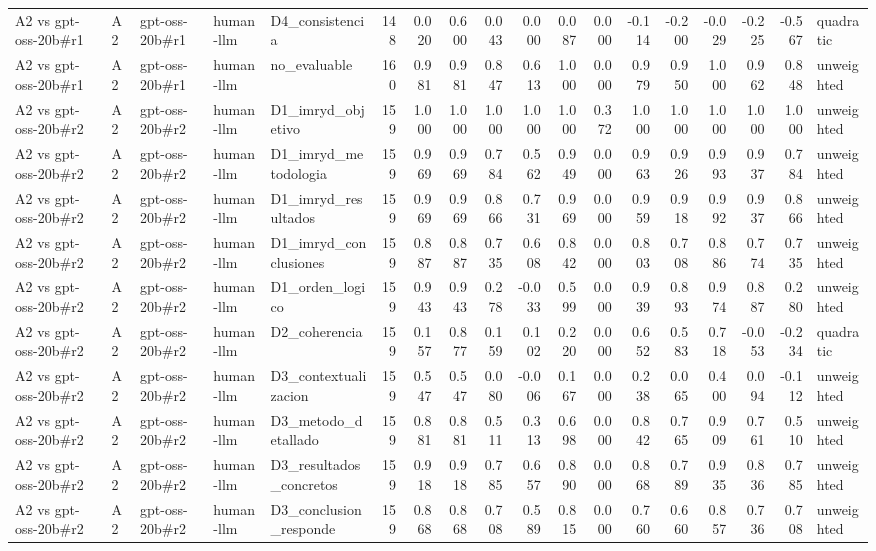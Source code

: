 \begin{table}
{\begin{tabular}{lllllrrrrrrrrrrrrl}
A2 vs gpt-oss-20b\#r1 & A2 & gpt-oss-20b\#r1 & human-llm & D4\_consistencia & 148 & 0.020 & 0.600 & 0.043 & 0.000 & 0.087 & 0.000 & -0.114 & -0.200 & -0.029 & -0.225 & -0.567 & quadratic \\
A2 vs gpt-oss-20b\#r1 & A2 & gpt-oss-20b\#r1 & human-llm & no\_evaluable & 160 & 0.981 & 0.981 & 0.847 & 0.613 & 1.000 & 0.000 & 0.979 & 0.950 & 1.000 & 0.962 & 0.848 & unweighted \\
A2 vs gpt-oss-20b\#r2 & A2 & gpt-oss-20b\#r2 & human-llm & D1\_imryd\_objetivo & 159 & 1.000 & 1.000 & 1.000 & 1.000 & 1.000 & 0.372 & 1.000 & 1.000 & 1.000 & 1.000 & 1.000 & unweighted \\
A2 vs gpt-oss-20b\#r2 & A2 & gpt-oss-20b\#r2 & human-llm & D1\_imryd\_metodologia & 159 & 0.969 & 0.969 & 0.784 & 0.562 & 0.949 & 0.000 & 0.963 & 0.926 & 0.993 & 0.937 & 0.784 & unweighted \\
A2 vs gpt-oss-20b\#r2 & A2 & gpt-oss-20b\#r2 & human-llm & D1\_imryd\_resultados & 159 & 0.969 & 0.969 & 0.866 & 0.731 & 0.969 & 0.000 & 0.959 & 0.918 & 0.992 & 0.937 & 0.866 & unweighted \\
A2 vs gpt-oss-20b\#r2 & A2 & gpt-oss-20b\#r2 & human-llm & D1\_imryd\_conclusiones & 159 & 0.887 & 0.887 & 0.735 & 0.608 & 0.842 & 0.000 & 0.803 & 0.708 & 0.886 & 0.774 & 0.735 & unweighted \\
A2 vs gpt-oss-20b\#r2 & A2 & gpt-oss-20b\#r2 & human-llm & D1\_orden\_logico & 159 & 0.943 & 0.943 & 0.278 & -0.033 & 0.599 & 0.000 & 0.939 & 0.893 & 0.974 & 0.887 & 0.280 & unweighted \\
A2 vs gpt-oss-20b\#r2 & A2 & gpt-oss-20b\#r2 & human-llm & D2\_coherencia & 159 & 0.157 & 0.877 & 0.159 & 0.102 & 0.220 & 0.000 & 0.652 & 0.583 & 0.718 & -0.053 & -0.234 & quadratic \\
A2 vs gpt-oss-20b\#r2 & A2 & gpt-oss-20b\#r2 & human-llm & D3\_contextualizacion & 159 & 0.547 & 0.547 & 0.080 & -0.006 & 0.167 & 0.000 & 0.238 & 0.065 & 0.400 & 0.094 & -0.112 & unweighted \\
A2 vs gpt-oss-20b\#r2 & A2 & gpt-oss-20b\#r2 & human-llm & D3\_metodo\_detallado & 159 & 0.881 & 0.881 & 0.511 & 0.313 & 0.698 & 0.000 & 0.842 & 0.765 & 0.909 & 0.761 & 0.510 & unweighted \\
A2 vs gpt-oss-20b\#r2 & A2 & gpt-oss-20b\#r2 & human-llm & D3\_resultados\_concretos & 159 & 0.918 & 0.918 & 0.785 & 0.657 & 0.890 & 0.000 & 0.868 & 0.789 & 0.935 & 0.836 & 0.785 & unweighted \\
A2 vs gpt-oss-20b\#r2 & A2 & gpt-oss-20b\#r2 & human-llm & D3\_conclusion\_responde & 159 & 0.868 & 0.868 & 0.708 & 0.589 & 0.815 & 0.000 & 0.760 & 0.660 & 0.857 & 0.736 & 0.708 & unweighted \\

\end{tabular}}
\end{table}
